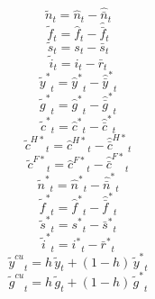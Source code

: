 \begin{dmath}
{{\tilde n}}_{t}={{\hat n}}_{t}-{{\hat {\bar n}}}_{t}
\end{dmath}
\begin{dmath}
{{\tilde f}}_{t}={{\hat f}}_{t}-{{\hat {\bar f}}}_{t}
\end{dmath}
\begin{dmath}
{{\tilde s}}_{t}={{s}}_{t}-{{\bar s}}_{t}
\end{dmath}
\begin{dmath}
{{\tilde i}}_{t}={{i}}_{t}-{{\bar r}}_{t}
\end{dmath}
\begin{dmath}
{{\tilde y^*}}_{t}={{\hat y^*}}_{t}-{{\hat {\bar y}^*}}_{t}
\end{dmath}
\begin{dmath}
{{\tilde g^*}}_{t}={{\hat g^*}}_{t}-{{\hat {\bar g}^*}}_{t}
\end{dmath}
\begin{dmath}
{{\tilde c^*}}_{t}={{\hat c^*}}_{t}-{{\hat {\bar c}^*}}_{t}
\end{dmath}
\begin{dmath}
{{\tilde c^{H*}}}_{t}={{\hat c^{H*}}}_{t}-{{\hat {\bar c}^{H*}}}_{t}
\end{dmath}
\begin{dmath}
{{\tilde c^{F*}}}_{t}={{\hat c^{F*}}}_{t}-{{\hat {\bar c}^{F*}}}_{t}
\end{dmath}
\begin{dmath}
{{\tilde n^*}}_{t}={{\hat n^*}}_{t}-{{\hat {\bar n}^*}}_{t}
\end{dmath}
\begin{dmath}
{{\tilde f^*}}_{t}={{\hat f^*}}_{t}-{{\hat {\bar f}^*}}_{t}
\end{dmath}
\begin{dmath}
{{\tilde s^*}}_{t}={{s^*}}_{t}-{{\bar s^*}}_{t}
\end{dmath}
\begin{dmath}
{{\tilde i^*}}_{t}={{i^*}}_{t}-{{\bar r^*}}_{t}
\end{dmath}
\begin{dmath}
{{\tilde y^{cu}}}_{t}={{h}}\, {{\tilde y}}_{t}+\left(1-{{h}}\right)\, {{\tilde y^*}}_{t}
\end{dmath}
\begin{dmath}
{{\tilde g^{cu}}}_{t}={{h}}\, {{\tilde g}}_{t}+\left(1-{{h}}\right)\, {{\tilde g^*}}_{t}
\end{dmath}
